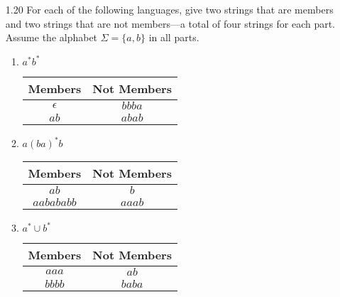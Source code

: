 \begin{enumerate}
    \item [1.20]
          For each of the following languages, give two strings that are members and two strings that are not members—a total of four strings for each part. Assume the alphabet $\Sigma=\{a,b\}$ in all parts.
          \begin{enumerate}
              \item $a^\ast b^\ast $
                    \begin{table}[H]
                        \centering
                        \begin{tabular}{|c|c|}
                            \hline
                            Members    & Not Members \\
                            \hline
                            $\epsilon$ & $bbba$      \\
                            $ab$       & $abab$      \\
                            \hline
                        \end{tabular}
                    \end{table}
              \item $a(ba)^\ast b $
                    \begin{table}[H]
                        \centering
                        \begin{tabular}{|c|c|}
                            \hline
                            Members    & Not Members \\
                            \hline
                            $ab$       & $b$         \\
                            $aabababb$ & $aaab$      \\
                            \hline
                        \end{tabular}
                    \end{table}
              \item $a^\ast \cup b^\ast $
                    \begin{table}[H]
                        \centering
                        \begin{tabular}{|c|c|}
                            \hline
                            Members & Not Members \\
                            \hline
                            $aaa$   & $ab$        \\
                            $bbbb$  & $baba$      \\

\end{tabular}
\end{table}
\end{enumerate}
\end{enumerate}
